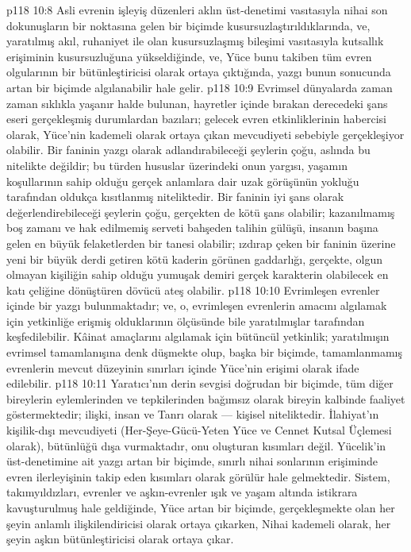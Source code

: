 \vs p118 10:8 Asli evrenin işleyiş düzenleri aklın üst\hyp{}denetimi vasıtasıyla nihai son dokunuşların bir noktasına gelen bir biçimde kusursuzlaştırıldıklarında, ve, yaratılmış akıl, ruhaniyet ile olan kusursuzlaşmış bileşimi vasıtasıyla kutsallık erişiminin kusursuzluğuna yükseldiğinde, ve, Yüce bunu takiben tüm evren olgularının  bir bütünleştiricisi olarak ortaya çıktığında, yazgı bunun sonucunda artan bir biçimde algılanabilir hale gelir.
\vs p118 10:9 Evrimsel dünyalarda zaman zaman sıklıkla yaşanır halde bulunan, hayretler içinde bırakan derecedeki şans eseri gerçekleşmiş durumlardan bazıları; gelecek evren etkinliklerinin habercisi olarak, Yüce’nin kademeli olarak ortaya çıkan mevcudiyeti sebebiyle gerçekleşiyor olabilir. Bir faninin yazgı olarak adlandırabileceği şeylerin çoğu, aslında bu nitelikte değildir; bu türden hususlar üzerindeki onun yargısı, yaşamın koşullarının sahip olduğu gerçek anlamlara dair uzak görüşünün yokluğu tarafından oldukça kısıtlanmış niteliktedir. Bir faninin iyi şans olarak değerlendirebileceği şeylerin çoğu, gerçekten de kötü şans olabilir; kazanılmamış boş zamanı ve hak edilmemiş serveti bahşeden talihin gülüşü, insanın başına gelen en büyük felaketlerden bir tanesi olabilir; ızdırap çeken bir faninin üzerine yeni bir büyük derdi getiren kötü kaderin görünen gaddarlığı, gerçekte, olgun olmayan kişiliğin sahip olduğu yumuşak demiri gerçek karakterin olabilecek en katı çeliğine dönüştüren dövücü ateş olabilir.
\vs p118 10:10 Evrimleşen evrenler içinde bir yazgı bulunmaktadır; ve, o, evrimleşen evrenlerin amacını algılamak için yetkinliğe erişmiş olduklarının ölçüsünde bile yaratılmışlar tarafından keşfedilebilir. Kâinat amaçlarını algılamak için bütüncül yetkinlik; yaratılmışın evrimsel tamamlanışına denk düşmekte olup, başka bir biçimde, tamamlanmamış evrenlerin mevcut düzeyinin sınırları içinde Yüce’nin erişimi olarak ifade edilebilir.
\vs p118 10:11 Yaratıcı’nın derin sevgisi doğrudan bir biçimde, tüm diğer bireylerin eylemlerinden ve tepkilerinden bağımsız olarak bireyin kalbinde faaliyet göstermektedir; ilişki, insan ve Tanrı olarak --- kişisel niteliktedir. İlahiyat’ın kişilik\hyp{}dışı mevcudiyeti (Her\hyp{}Şeye\hyp{}Gücü\hyp{}Yeten Yüce ve Cennet Kutsal Üçlemesi olarak), bütünlüğü dışa vurmaktadır, onu oluşturan kısımları değil. Yücelik’in üst\hyp{}denetimine ait yazgı artan bir biçimde, sınırlı nihai sonlarının erişiminde evren ilerleyişinin takip eden kısımları olarak görülür hale gelmektedir. Sistem, takımyıldızları, evrenler ve aşkın\hyp{}evrenler ışık ve yaşam altında istikrara kavuşturulmuş hale geldiğinde, Yüce artan bir biçimde, gerçekleşmekte olan her şeyin anlamlı ilişkilendiricisi olarak ortaya çıkarken, Nihai kademeli olarak, her şeyin aşkın bütünleştiricisi olarak ortaya çıkar.

